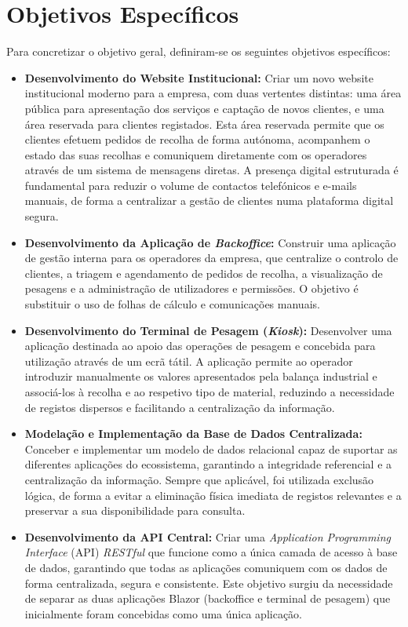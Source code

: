 \section{Objetivos Específicos}

Para concretizar o objetivo geral, definiram-se os seguintes objetivos específicos:

\begin{itemize}
    \item \textbf{Desenvolvimento do Website Institucional:} Criar um novo website institucional moderno para a empresa, com duas vertentes distintas: uma área pública para apresentação dos serviços e captação de novos clientes, e uma área reservada para clientes registados. Esta área reservada permite que os clientes efetuem pedidos de recolha de forma autónoma, acompanhem o estado das suas recolhas e comuniquem diretamente com os operadores através de um sistema de mensagens diretas. A presença digital estruturada é fundamental para reduzir o volume de contactos telefónicos e e-mails manuais, de forma a centralizar a gestão de clientes numa plataforma digital segura.
    \item \textbf{Desenvolvimento da Aplicação de \textit{Backoffice}:} Construir uma aplicação de gestão interna para os operadores da empresa, que centralize o controlo de clientes, a triagem e agendamento de pedidos de recolha, a visualização de pesagens e a administração de utilizadores e permissões. O objetivo é substituir o uso de folhas de cálculo e comunicações manuais.
    \item \textbf{Desenvolvimento do Terminal de Pesagem (\textit{Kiosk}):} Desenvolver uma aplicação destinada ao apoio das operações de pesagem e concebida para utilização através de um ecrã tátil. A aplicação permite ao operador introduzir manualmente os valores apresentados pela balança industrial e associá-los à recolha e ao respetivo tipo de material, reduzindo a necessidade de registos dispersos e facilitando a centralização da informação.

    \item \textbf{Modelação e Implementação da Base de Dados Centralizada:} Conceber e implementar um modelo de dados relacional capaz de suportar as diferentes aplicações do ecossistema, garantindo a integridade referencial e a centralização da informação. Sempre que aplicável, foi utilizada exclusão lógica, de forma a evitar a eliminação física imediata de registos relevantes e a preservar a sua disponibilidade para consulta.

    \item \textbf{Desenvolvimento da \ac{API} Central:} Criar uma \textit{Application Programming Interface} (API) \textit{RESTful} que funcione como a única camada de acesso à base de dados, garantindo que todas as aplicações comuniquem com os dados de forma centralizada, segura e consistente. Este objetivo surgiu da necessidade de separar as duas aplicações Blazor (backoffice e terminal de pesagem) que inicialmente foram concebidas como uma única aplicação.


\end{itemize}
